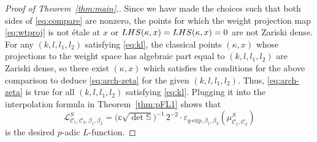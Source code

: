 \documentclass[10pt]{amsart}
\newcommand{\Lfunction}{$L$\nobreakdash-func\-tion\xspace}
\theoremstyle{plain}
\theoremstyle{remark}
\newcommand{\bS}{\mathbb{S}}
\newcommand{\bbc}{\mathbb{c}}
\newcommand{\cL}{\mathcal{L}}
\newcommand{\sC}{\mathscr{C}}
\newcommand{\qexp}{q\text{-}\mathrm{exp}}
\begin{document}
\begin{proof}[Proof of Theorem~\ref{thm:main}.]
Since we have made the choices such that both sides of \eqref{eq:compare} are nonzero, the points for which the weight projection map \eqref{eq:wtproj} is not \'{e}tale at $x$ or ${\rm LHS}(\kappa,x)={\rm LHS}(\kappa,x)=0$ are not Zariski dense. For any $(k,l,l_1,l_2)$ satisfying \eqref{eq:kl}, the classical points $(\kappa,x)$ whose projections to the weight space has algebraic part equal to $(k,l,l_1,l_2)$ are Zariski dense, so there exist $(\kappa,x)$ which satisfies the conditions for the above comparison to deduce \eqref{eq:arch-zeta} for the given $(k,l,l_1,l_2)$. Thus, \eqref{eq:arch-zeta} is true for all $(k,l,l_1,l_2)$ satisfying \eqref{eq:kl}. Plugging it into the interpolation formula in Theorem~\ref{thm:pFL1} shows that
\[
\cL^S_{\sC_1,\sC_2,\beta_1,\beta_2}=\bigl(\bbc\sqrt{\det\bS}\bigr)^{-1}\,2^{-2}\cdot \varepsilon_{\qexp,\beta_1,\beta_2}\left(\mu^S_{\sC_1,\sC_2}\right)
\]
is the desired $p$-adic \Lfunction.
\end{proof}
\end{document}
